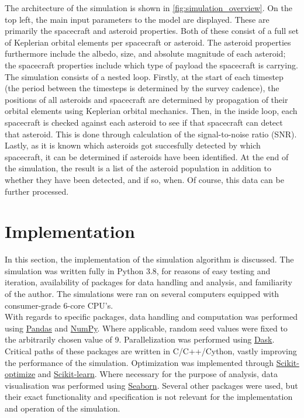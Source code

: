 The architecture of the simulation is shown in \autoref{fig:simulation_overview}. On the top left, the main input parameters to the model are displayed. These are primarily the spacecraft and asteroid properties. Both of these consist of a full set of Keplerian orbital elements per spacecraft or asteroid. The asteroid properties furthermore include the albedo, size, and absolute magnitude of each asteroid; the spacecraft properties include which type of payload the spacecraft is carrying. \\

The simulation consists of a nested loop. Firstly, at the start of each timestep (the period between the timesteps is determined by the survey cadence), the positions of all asteroids and spacecraft are determined by propagation of their orbital elements using Keplerian orbital mechanics. Then, in the inside loop, each spacecraft is checked against each asteroid to see if that spacecraft can detect that asteroid. This is done through calculation of the signal-to-noise ratio (SNR). Lastly, as it is known which asteroids got succesfully detected by which spacecraft, it can be determined if asteroids have been identified. At the end of the simulation, the result is a list of the asteroid population in addition to whether they have been detected, and if so, when. Of course, this data can be further processed.

\section{Implementation}
\label{sec:methodologyimplementation}
In this section, the implementation of the simulation algorithm is discussed. The simulation was written fully in Python 3.8, for reasons of easy testing and iteration, availability of packages for data handling and analysis, and familiarity of the author. The simulations were ran on several computers equipped with consumer-grade 6-core CPU's. \\

With regards to specific packages, data handling and computation was performed using \href{https://pandas.pydata.org}{Pandas} and \href{https://numpy.org}{NumPy}. Where applicable, random seed values were fixed to the arbitrarily chosen value of 9. Parallelization was performed using \href{https://dask.org}{Dask}. Critical paths of these packages are written in C/C++/Cython, vastly improving the performance of the simulation. Optimization was implemented through \href{https://pypi.org/project/scikit-optimize}{Scikit-optimize} and \href{https://scikit-learn.org/stable/index.html}{Scikit-learn}. Where necessary for the purpose of analysis, data visualisation was performed using \href{https://seaborn.pydata.org}{Seaborn}. Several other packages were used, but their exact functionality and specification is not relevant for the implementation and operation of the simulation.

